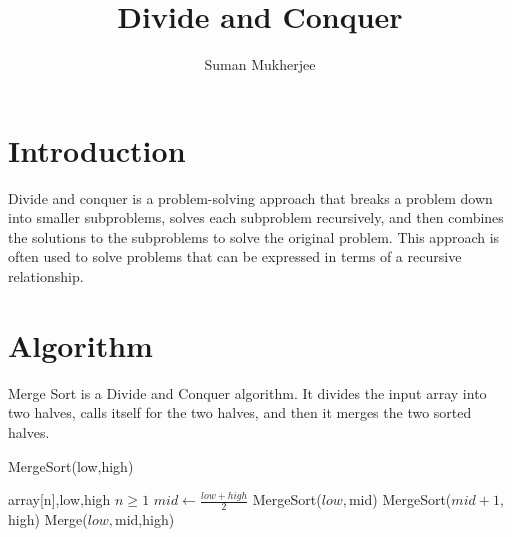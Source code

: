 \documentclass[10pt]{article}
\begin{document}
\title{Divide and Conquer}

\author{Suman Mukherjee}

\maketitle

\section{Introduction}

Divide and conquer is a problem-solving approach that breaks a problem down into smaller subproblems, solves each subproblem recursively, and then combines the solutions to the subproblems to solve the original problem. This approach is often used to solve problems that can be expressed in terms of a recursive relationship.



\section{Algorithm}
Merge Sort is a Divide and Conquer algorithm. It divides the input array into two halves, calls itself for the two halves, and then it merges the two sorted halves.\\
\begin{algorithm}
    \caption{MergeSort(low,high)}
    \begin{algorithmic}
        \Require array[n],low,high
        \Ensure $n \geq 1$
            \State $mid \gets \frac{low + high}{2}$
            \State MergeSort($low,$mid)
            \State MergeSort($mid+1,$high)
            \State Merge($low,$mid,high)
        \EndIf
    \end{algorithmic}
\end{algorithm}\\
\\
\pagebreak
\end{document}
